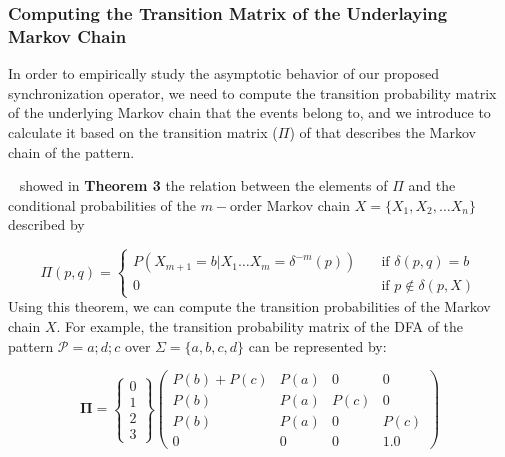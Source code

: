 
 
\subsubsection{Computing the Transition Matrix of the Underlaying Markov Chain}

\par In order to empirically study the asymptotic behavior of our proposed synchronization operator, we need to compute the transition probability matrix of the underlying Markov chain that the events belong to, and we introduce to calculate it  based on the transition matrix ($\Pi$) of \pmcmr that describes the Markov chain of the pattern.

~\citet{nuel_pattern_2008} showed in \textbf{Theorem 3} the relation between the elements  of 
$\Pi$ and the conditional probabilities of the $m-$order Markov chain $X=\{X_1, X_2, \ldots X_n\}$ described by 

\[ \Pi(p, q) =
\begin{cases}
P(X_{m+1}=b|X_1\ldots X_m=\delta^{-m}(p))     & \quad \text{if } \delta(p,q)=b \\
0  & \quad \text{if } p \notin  \delta(p,X)
\end{cases}
\]
Using this theorem, we can compute the transition probabilities of the Markov chain $X$. For example, the transition probability matrix of the DFA of  the pattern $\mathcal{P}=a ; d ; c$ over  $\Sigma=\{a,b,c,d\}$ can be represented by: 

\begin{equation*}
\label{eq:matrix}
\boldsymbol{\Pi} = 
\begin{Bmatrix} 
0 \\ 1 \\ 2 \\ 3 
\end{Bmatrix}
\begin{pmatrix} 
P(b)+P(c) 	& P(a) 		& 0 		& 0 \\
P(b) 		& P(a)		& P(c)		& 0 \\
P(b)		& P(a)		& 0			& P(c) \\
0			& 0			& 0			& 1.0
\end{pmatrix}
\end{equation*} 

